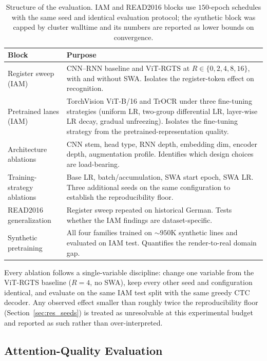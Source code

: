 \begin{table}[h]
\centering
\small
\caption{Structure of the evaluation. IAM and READ2016 blocks use $150$-epoch schedules with the same seed and identical evaluation protocol; the synthetic block was capped by cluster walltime and its numbers are reported as lower bounds on convergence.}
\label{tab:matrix}
\begin{tabular}{lp{9cm}}
\toprule
Block & Purpose \\
\midrule
Register sweep (IAM)         & CNN--RNN baseline and ViT-RGTS at $R \in \{0, 2, 4, 8, 16\}$, with and without SWA. Isolates the register-token effect on recognition. \\
Pretrained lanes (IAM)       & TorchVision ViT-B/16 and TrOCR under three fine-tuning strategies (uniform LR, two-group differential LR, layer-wise LR decay, gradual unfreezing). Isolates the fine-tuning strategy from the pretrained-representation quality. \\
Architecture ablations       & CNN stem, head type, RNN depth, embedding dim, encoder depth, augmentation profile. Identifies which design choices are load-bearing. \\
Training-strategy ablations  & Base LR, batch/accumulation, SWA start epoch, SWA LR. Three additional seeds on the same configuration to establish the reproducibility floor. \\
READ2016 generalization      & Register sweep repeated on historical German. Tests whether the IAM findings are dataset-specific. \\
Synthetic pretraining        & All four families trained on ${\sim}950$K synthetic lines and evaluated on IAM test. Quantifies the render-to-real domain gap. \\
\bottomrule
\end{tabular}
\end{table}

Every ablation follows a single-variable discipline: change one variable from the ViT-RGTS baseline ($R = 4$, no SWA), keep every other seed and configuration identical, and evaluate on the same IAM test split with the same greedy CTC decoder. Any observed effect smaller than roughly twice the reproducibility floor (Section~\ref{sec:res_seeds}) is treated as unresolvable at this experimental budget and reported as such rather than over-interpreted.

\subsection{Attention-Quality Evaluation}
\label{sec:attn_eval}


